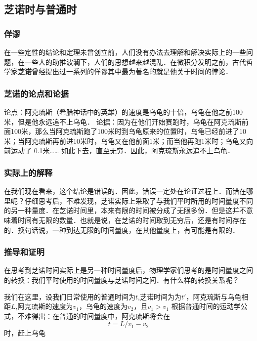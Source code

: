 \subsection{芝诺时与普通时}

\subsubsection{佯谬}
在一些定性的结论和定理未曾创立前，人们没有办法去理解和解决实际上的一些问题，在一些人的助推波澜下，人们的思想越来越混乱．在微积分发明之前，古代哲学家\textbf{芝诺}曾经提出过一系列的佯谬其中最为著名的就是他关于时间的悖论．

\subsubsection{芝诺的论点和论据}
论点：阿克琉斯（希腊神话中的英雄）的速度是乌龟的十倍，乌龟在他之前100米，但是他永远追不上乌龟．
论据：因为在他们开始赛跑时，乌龟在阿克琉斯前面100米，那么当阿克琉斯跑了100米时到乌龟原来的位置时，乌龟已经前进了10米；当阿克琉斯再前进10米时，乌龟又在他前面1米；而当他再跑1米时；乌龟又向前运动了  0.1米…… 如此下去，直至无穷．因此，阿克琉斯永远追不上乌龟．

\subsubsection{实际上的解释}
在我们现在看来，这个结论是错误的．因此，错误一定处在论证过程上．而错在哪里呢？仔细思考后，不难发现，芝诺实际上采取了与我们平时所用的时间量度不同的另一种量度．在芝诺时间里，本来有限的时间被分成了无限多份．但是这并不意味着时间有无限的数量．也就是说，在芝诺的时间取到无穷后，还是有时间存在的．换句话说，一种到达无限的时间量度，在其他量度上，有可能是有限的．

\subsubsection{推导和证明}
在思考到芝诺时间实际上是另一种时间量度后，物理学家们思考的是时间量度之间的转换：我们平时使用的时间量度与芝诺时间之间．有什么样的转换关系呢？

我们在这里，设我们日常使用的普通时间为$t$,芝诺时间为为$t'$，阿克琉斯与乌龟相距$L$,阿克琉斯的速度为$v_1$，乌龟的速度为$v_2$，且$v_1>v_1$
根据普通时间的运动学公式，不难得出：在普通的时间量度中，阿克琉斯将会在
\begin{equation}
t = {L}/{v_1-v_2}
\end{equation}
时，赶上乌龟